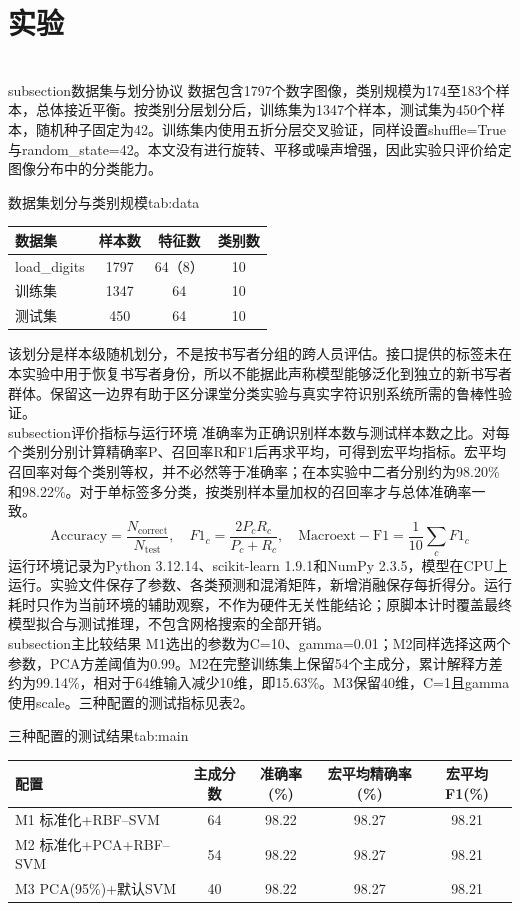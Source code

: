 \documentclass[supercite]{HustGSClassPaper}
\begin{document}
\section{实验}
\\subsection{数据集与划分协议}
数据包含1797个数字图像，类别规模为174至183个样本，总体接近平衡。按类别分层划分后，训练集为1347个样本，测试集为450个样本，随机种子固定为42。训练集内使用五折分层交叉验证，同样设置shuffle=True与random\_state=42。本文没有进行旋转、平移或噪声增强，因此实验只评价给定图像分布中的分类能力。
\begin{generaltab}{数据集划分与类别规模}{tab:data}
\begin{tabularx}{\textwidth}{lCCC}
\toprule
数据集 & 样本数 & 特征数 & 类别数 \\
\midrule
load\_digits & 1797 & 64（8） & 10 \\
训练集 & 1347 & 64 & 10 \\
测试集 & 450 & 64 & 10 \\
\bottomrule
\end{tabularx}
\end{generaltab}
该划分是样本级随机划分，不是按书写者分组的跨人员评估。接口提供的标签未在本实验中用于恢复书写者身份，所以不能据此声称模型能够泛化到独立的新书写者群体。保留这一边界有助于区分课堂分类实验与真实字符识别系统所需的鲁棒性验证。
\\subsection{评价指标与运行环境}
准确率为正确识别样本数与测试样本数之比。对每个类别分别计算精确率P、召回率R和F1后再求平均，可得到宏平均指标。宏平均召回率对每个类别等权，并不必然等于准确率；在本实验中二者分别约为98.20\%和98.22\%。对于单标签多分类，按类别样本量加权的召回率才与总体准确率一致。
\begin{equation}
\mathrm{Accuracy}=\frac{N_{\mathrm{correct}}}{N_{\mathrm{test}}},\quad F1_c=\frac{2P_cR_c}{P_c+R_c},\quad \mathrm{Macro	ext{-}F1}=\frac{1}{10}\sum_cF1_c
\end{equation}
运行环境记录为Python 3.12.14、scikit-learn 1.9.1和NumPy 2.3.5，模型在CPU上运行。实验文件保存了参数、各类预测和混淆矩阵，新增消融保存每折得分。运行耗时只作为当前环境的辅助观察，不作为硬件无关性能结论；原脚本计时覆盖最终模型拟合与测试推理，不包含网格搜索的全部开销。
\\subsection{主比较结果}
M1选出的参数为C=10、gamma=0.01；M2同样选择这两个参数，PCA方差阈值为0.99。M2在完整训练集上保留54个主成分，累计解释方差约为99.14\%，相对于64维输入减少10维，即15.63\%。M3保留40维，C=1且gamma使用scale。三种配置的测试指标见表2。
\begin{generaltab}{三种配置的测试结果}{tab:main}
\begin{tabularx}{\textwidth}{lCCCC}
\toprule
配置 & 主成分数 & 准确率(\%) & 宏平均精确率(\%) & 宏平均F1(\%) \\
\midrule
M1 标准化+RBF--SVM & 64 & 98.22 & 98.27 & 98.21 \\
M2 标准化+PCA+RBF--SVM & 54 & 98.22 & 98.27 & 98.21 \\
M3 PCA(95\%)+默认SVM & 40 & 98.22 & 98.27 & 98.21 \\
\bottomrule
\end{tabularx}
\end{generaltab}
\end{document}
